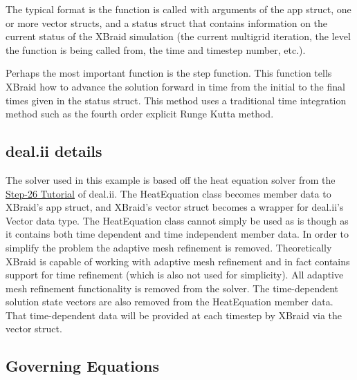 \documentclass{article}
\begin{document}
The typical format is the function is called with arguments of the app struct, one or more vector structs, and a status struct that contains information on the current status of the XBraid simulation (the current multigrid iteration, the level the function is being called from, the time and timestep number, etc.).

Perhaps the most important function is the step function.
This function tells XBraid how to advance the solution forward in time from the initial to the final times given in the status struct.
This method uses a traditional time integration method such as the fourth order explicit Runge Kutta method.

\subsection{deal.ii details}\label{deal.ii-details}

The solver used in this example is based off the heat equation solver from the \href{https://dealii.org/developer/doxygen/deal.II/step\_26.html}{Step-26 Tutorial} of deal.ii\cite{BangerthHartmannKanschat2007}.
The HeatEquation class becomes member data to XBraid's app struct, and XBraid's vector struct becomes a wrapper for deal.ii's Vector data type.
The HeatEquation class cannot simply be used as is though as it contains both time dependent and time independent member data.
In order to simplify the problem the adaptive mesh refinement is removed.
Theoretically XBraid is capable of working with adaptive mesh refinement and in fact contains support for time refinement (which is also not used for simplicity).
All adaptive mesh refinement functionality is removed from the solver.
The time-dependent solution state vectors are also removed from the HeatEquation member data.
That time-dependent data will be provided at each timestep by XBraid via the vector struct.

\subsection{Governing Equations}\label{math-details}
\end{document}
